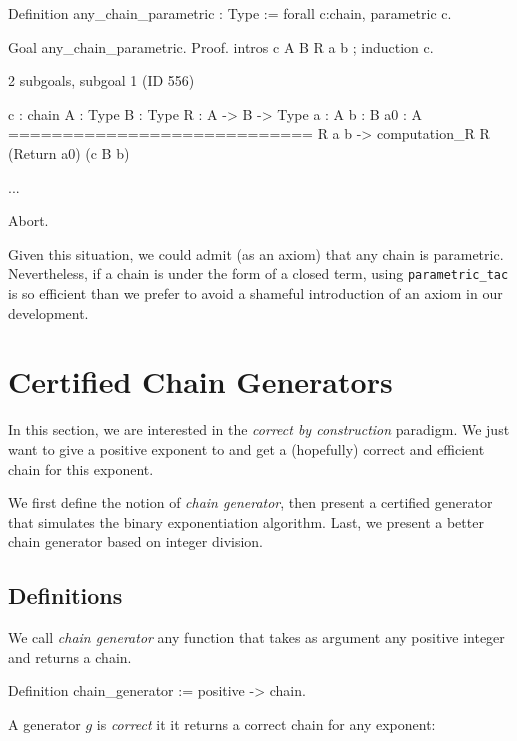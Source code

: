  
\begin{Coqbad}
Definition any_chain_parametric : Type :=
 forall c:chain, parametric c.

Goal any_chain_parametric.
Proof.
intros c A B R a b ; induction c.
\end{Coqbad}

\begin{Coqanswer}
 2 subgoals, subgoal 1 (ID 556)
  
  c : chain
  A : Type
  B : Type
  R : A -> B -> Type
  a : A
  b : B
  a0 : A
  ============================
   R a b -> computation_R R (Return a0) (c B b)

...
\end{Coqanswer}


\begin{Coqbad}
Abort.
\end{Coqbad}


Given this situation, we could  admit (as an axiom) that 
any chain is parametric. Nevertheless, if a chain is under the form of a 
closed term, using \texttt{parametric\_tac} is so efficient than we prefer to 
 avoid
a shameful introduction of an axiom in our development.

\section{Certified Chain Generators}
\label{chain-generation}

In this section, we are interested in the \emph{correct by construction} paradigm.
We just want to give a positive exponent to \coq{} and get a (hopefully)  correct and  efficient chain for this exponent.

We first define the notion of \emph{chain generator}, then present a certified generator that simulates the binary exponentiation algorithm. Last, we present a better chain generator based on integer division.


\subsection{Definitions}

We call \emph{chain generator} any function that takes as argument 
any positive integer and returns a chain. 

\begin{Coqsrc}
Definition chain_generator := positive -> chain.  
\end{Coqsrc}

A generator $g$  is \emph{correct} it it returns a correct chain
for any exponent:


